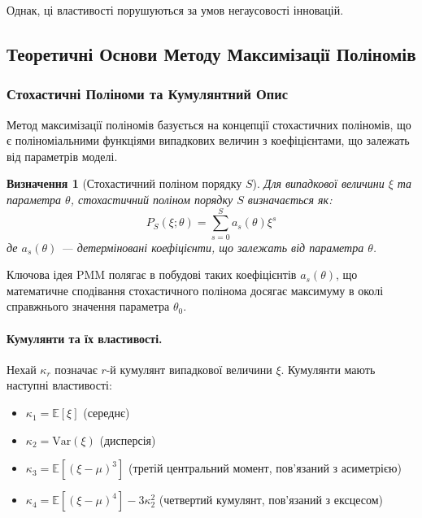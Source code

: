 \documentclass[12pt,a4paper]{article}
\newtheorem{definition}[theorem]{Визначення}
\begin{document}
	Однак, ці властивості порушуються за умов негаусовості інновацій.
	
	\subsection{Теоретичні Основи Методу Максимізації Поліномів}
	\label{subsec:pmm_theory}
	
	\subsubsection{Стохастичні Поліноми та Кумулянтний Опис}
	
	Метод максимізації поліномів базується на концепції стохастичних поліномів, що є поліноміальними функціями випадкових величин з коефіцієнтами, що залежать від параметрів моделі.
	
	\begin{definition}[Стохастичний поліном порядку $S$]
		Для випадкової величини $\xi$ та параметра $\theta$, стохастичний поліном порядку $S$ визначається як:
		\begin{equation}
			\label{eq:stochastic_polynomial}
			P_S(\xi; \theta) = \sum_{s=0}^{S} a_s(\theta) \xi^s
		\end{equation}
		де $a_s(\theta)$ --- детерміновані коефіцієнти, що залежать від параметра $\theta$.
	\end{definition}
	
	Ключова ідея PMM полягає в побудові таких коефіцієнтів $a_s(\theta)$, що математичне сподівання стохастичного полінома досягає максимуму в околі справжнього значення параметра $\theta_0$.
	
	\paragraph{Кумулянти та їх властивості.}
	
	Нехай $\kappa_r$ позначає $r$-й кумулянт випадкової величини $\xi$. Кумулянти мають наступні властивості:
	
	\begin{itemize}
		\item $\kappa_1 = \mathbb{E}[\xi]$ (середнє)
		\item $\kappa_2 = \text{Var}(\xi)$ (дисперсія)
		\item $\kappa_3 = \mathbb{E}[(\xi - \mu)^3]$ (третій центральний момент, пов'язаний з асиметрією)
		\item $\kappa_4 = \mathbb{E}[(\xi - \mu)^4] - 3\kappa_2^2$ (четвертий кумулянт, пов'язаний з ексцесом)
	\end{itemize}
	
\end{document}
